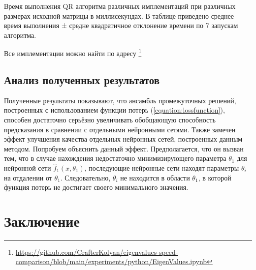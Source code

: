 \documentclass[12pt, fleqn]{article}
\newcommand{\predictionfunction}{\hat{f}}
\newcommand{\reference}[1]{(\hyperref[#1]{\ref{#1}})}
\begin{document}
\begin{center}
	
	\begin{table}[h!]
		\caption{Время выполнения QR алгоритма различных имплементаций при различных размерах исходной матрицы в миллисекундах. В таблице приведено среднее время выполнения ± средне квадратичное отклонение времени по 7 запускам алгоритма.}
		\label{tabular:results}
	\end{table}
\end{center}

Все имплементации можно найти по адресу \footnote{\href{https://github.com/CrafterKolyan/eigenvalues-speed-comparison/blob/main/experiments/python/EigenValues.ipynb}{https://github.com/CrafterKolyan/eigenvalues-speed-comparison/blob/main/experiments/python/EigenValues.ipynb}}

\subsection{Анализ полученных результатов}

Полученные результаты показывают, что ансамбль промежуточных решений, построенных с использованием функции потерь \reference{equation:lossfunction}, способен достаточно серьёзно увеличивать обобщающую способность предсказания в сравнении с отдельными нейронными сетями.
Также замечен эффект улучшения качества отдельных нейронных сетей, построенных данным методом. Попробуем объяснить данный эффект. Предполагается, что он вызван тем, что в случае нахождения недостаточно минимизирующего параметра $\theta_1$ для нейронной сети $\predictionfunction_1(x, \theta_1)$, последующие нейронные сети находят параметры $\theta_i$ на отдалении от $\theta_1$. Следовательно, $\theta_i$ не находится в области $\theta_1$, в которой функция потерь не достигает своего минимального значения.

\section{Заключение}
\end{document}
